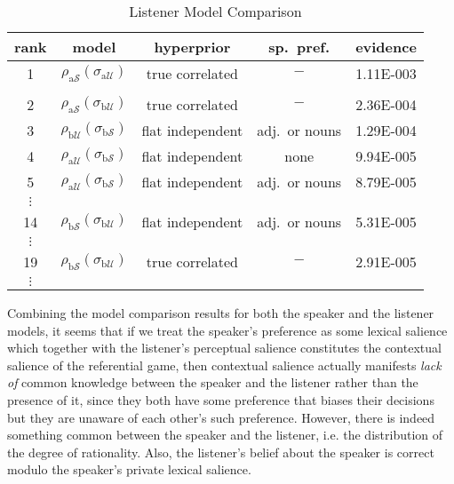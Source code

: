 \begin{table}[htb] 
\caption{Listener Model Comparison}
  \centering 
  \begin{tabular}{ccccc}
    rank
    & model
    & hyperprior
    & sp.~pref.
    & evidence 
    \\ \hline
    1 
    & $\rho_{\mathrm{a}\mathcal{S}}(\sigma_{\mathrm{a}\mathcal{U}})$
    & true correlated
    & $-$
    & 1.11E-003
    \\ \\
    2 
    & $\rho_{\mathrm{ a}\mathcal{S}}(\sigma_{\mathrm{b}\mathcal{U}})$
    & true correlated
    & $-$
    & 2.36E-004
    \\     
    3 
    & $\rho_{\mathrm{b}\mathcal{U}}(\sigma_{\mathrm{b}\mathcal{S}})$
    & flat independent \quad
    & adj.~or nouns \quad
    & 1.29E-004
    \\     
    4 
    & $\rho_{\mathrm{a}\mathcal{U}}(\sigma_{\mathrm{b}\mathcal{S}})$
    & flat independent
    & none
    & 9.94E-005
    \\     
    5 
    & $\rho_{\mathrm{a}\mathcal{U}}(\sigma_{\mathrm{b}\mathcal{S}})$
    & flat independent
    & adj.~or nouns
    & 8.79E-005
    \\
    $\vdots$\\
    14 
    & $\rho_{\mathrm{b}\mathcal{S}}(\sigma_{\mathrm{b}\mathcal{U}})$
    & flat independent
    & adj.~or nouns
    & 5.31E-005
    \\
    $\vdots$\\
    19 
    & $\rho_{\mathrm{b}\mathcal{S}}(\sigma_{\mathrm{b}\mathcal{U}})$
    & true correlated
    & $-$
    & 2.91E-005
    \\
    $\vdots$
  \end{tabular}
  \label{table:listener mod}
\end{table}

Combining the model comparison results for both the speaker and the listener models, it seems that if we treat the speaker's preference as some lexical salience which together with the listener's perceptual salience constitutes the contextual salience of the referential game, then contextual salience actually manifests \emph{lack of} common knowledge between the speaker and the listener rather than the presence of it, since they both have some preference that biases their decisions but they are unaware of each other's such preference. However, there is indeed something common between the speaker and the listener, i.e. the distribution of the degree of rationality. Also, the listener's belief about the speaker is correct modulo the speaker's private lexical salience. 
